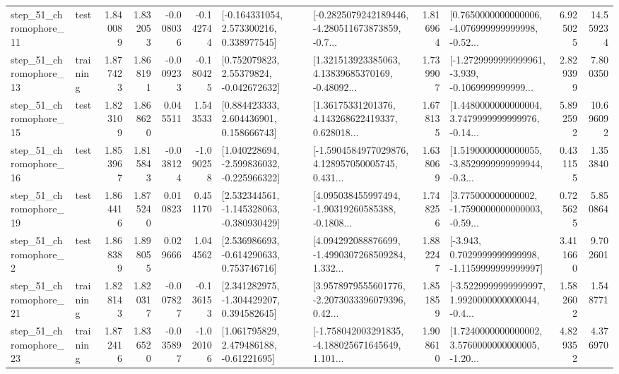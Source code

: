 \begin{tabular}{llrrrrllrlrr}
   step\_51\_chromophore\_11 &      test &      1.840089 &    1.832053 &     -0.008036 & -0.142744 &    [-0.164331054, 2.573300216, 0.338977545] &  [-0.2825079242189446, -4.280511673873859, -0.7... &       1.816964 &  [0.7650000000000006, -4.076999999999998, -0.52... &            6.925025 &         14.559234 \\
   step\_51\_chromophore\_13 &  training &      1.877423 &    1.868191 &     -0.009233 & -0.180425 &     [0.752079823, 2.55379824, -0.042672632] &  [1.321513923385063, 4.13839685370169, -0.48092... &       1.739907 &  [-1.2729999999999961, -3.939, -0.1069999999999... &            2.829399 &          7.800350 \\
   step\_51\_chromophore\_15 &      test &      1.823109 &    1.868620 &      0.045511 &  1.543533 &     [0.884423333, 2.604436901, 0.158666743] &  [1.36175331201376, 4.143268622419337, 0.628018... &       1.678135 &  [1.4480000000000004, 3.7479999999999976, -0.14... &            5.892592 &         10.696092 \\
   step\_51\_chromophore\_16 &      test &      1.853967 &    1.815843 &     -0.038124 & -1.090258 &   [1.040228694, -2.599836032, -0.225966322] &  [-1.5904584977029876, 4.128957050005745, 0.431... &       1.638069 &  [1.5190000000000055, -3.8529999999999944, -0.3... &            0.431155 &          1.353840 \\
   step\_51\_chromophore\_19 &      test &      1.864416 &    1.875240 &      0.010823 &  0.451170 &   [2.532344561, -1.145328063, -0.380930429] &  [4.095038455997494, -1.90319260585388, -0.1808... &       1.748256 &  [3.775000000000002, -1.7590000000000003, -0.59... &            0.725625 &          5.850864 \\
    step\_51\_chromophore\_2 &      test &      1.868389 &    1.898055 &      0.029666 &  1.044562 &    [2.536986693, -0.614290633, 0.753746716] &  [4.094292088876699, -1.4990307268509284, 1.332... &       1.882247 &  [-3.943, 0.7029999999999998, -1.1159999999999997] &            3.411660 &          9.702601 \\
   step\_51\_chromophore\_21 &  training &      1.828143 &    1.820317 &     -0.007827 & -0.136153 &    [2.341282975, -1.304429207, 0.394582645] &  [3.9578979555601776, -2.2073033396079396, 0.42... &       1.851859 &  [-3.5229999999999997, 1.9920000000000044, -0.4... &            1.582602 &          1.548771 \\
   step\_51\_chromophore\_23 &  training &      1.872416 &    1.836520 &     -0.035897 & -1.020106 &     [1.061795829, 2.479486188, -0.61221695] &  [-1.758042003291835, -4.188025671645649, 1.101... &       1.908610 &  [1.7240000000000002, 3.5760000000000005, -1.20... &            4.829352 &          4.376970 \\

\end{tabular}
